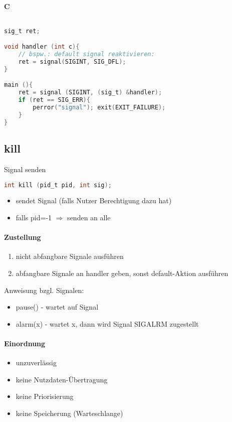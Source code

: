 \documentclass{scrreprt}
\begin{document}
\paragraph{C} $ $
\begin{lstlisting}[language=C]
sig_t ret;

void handler (int c){
	// bspw.: default signal reaktivieren:
	ret = signal(SIGINT, SIG_DFL);
}

main (){
	ret = signal (SIGINT, (sig_t) &handler);
	if (ret == SIG_ERR){
		perror("signal"); exit(EXIT_FAILURE);
	}
}
\end{lstlisting}

\subsection{kill}
Signal senden
\begin{lstlisting}[language=C]
int kill (pid_t pid, int sig);
\end{lstlisting}
\begin{itemize}
\item sendet Signal (falls Nutzer Berechtigung dazu hat)
\item falls pid=-1 $\Rightarrow$ senden an alle
\end{itemize}
\paragraph{Zustellung}
\begin{enumerate}
\item nicht abfangbare Signale ausführen
\item abfangbare Signale an handler geben, sonst default-Aktion ausführen
\end{enumerate}
Anweisung bzgl. Signalen:
\begin{itemize}
\item pause() - wartet auf Signal
\item alarm(x) - wartet x, dann wird Signal SIGALRM zugestellt
\end{itemize}
\paragraph{Einordnung}
\begin{itemize}
\item unzuverlässig
\item keine Nutzdaten-Übertragung
\item keine Priorisierung
\item keine Speicherung (Warteschlange)
\end{itemize}
\end{document}
